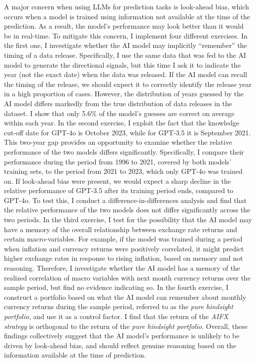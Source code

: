 \documentclass[12pt,oneside,letter]{article}
\begin{document}
	A major concern when using LLMs for prediction tasks is look-ahead bias, which occurs when a model is trained using information not available at the time of the prediction. As a result, the model’s performance may look better than it would be in real-time. To mitigate this concern, I implement four different exercises. In the first one, I investigate whether the AI model may implicitly “remember” the timing of a data release. Specifically, I use the same data that was fed to the AI model to generate the directional signals, but this time I ask it to indicate the year (not the exact date) when the data was released. If the AI model can recall the timing of the release, we should expect it to correctly identify the release year in a high proportion of cases. However, the distribution of years guessed by the AI model differs markedly from the true distribution of data releases in the dataset. I show that only 5.6\% of the model’s guesses are correct on average within each year. In the second exercise, I exploit the fact that the knowledge cut-off date for GPT-4o is October 2023, while for GPT-3.5 it is September 2021. This two-year gap provides an opportunity to examine whether the relative performance of the two models differs significantly. Specifically, I compare their performance during the period from 1996 to 2021, covered by both models' training sets, to the period from 2021 to 2023, which only GPT-4o was trained on. If look-ahead bias were present, we would expect a sharp decline in the relative performance of GPT-3.5 after its training period ends, compared to GPT-4o. To test this, I conduct a difference-in-differences analysis and find that the relative performance of the two models does not differ significantly across the two periods. In the third exercise, I test for the possibility that the AI model may have a memory of the overall relationship between exchange rate returns and certain macro-variables. For example, if the model was trained during a period when inflation and currency returns were positively correlated, it might predict higher exchange rates in response to rising inflation, based on memory and not reasoning. Therefore, I investigate whether the AI model has a memory of the realized correlation of macro variables with next month currency returns over the sample period, but find no evidence indicating so. In the fourth exercise, I construct a portfolio based on what the AI model can remember about monthly currency returns during the sample period, referred to as the \textit{pure hindsight portfolio}, and use it as a control factor. I find that the return of the \textit{AIFX strategy} is orthogonal to the return of the \textit{pure hindsight portfolio}. Overall, these findings collectively suggest that the AI model’s performance is unlikely to be driven by look-ahead bias, and should reflect genuine reasoning based on the information available at the time of prediction. \newline
\end{document}
